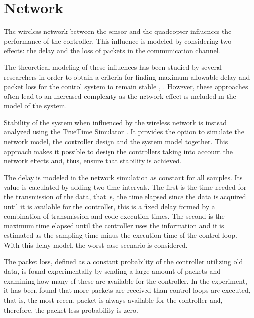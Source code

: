 \section{Network}\label{sec:network}
The wireless network between the sensor and the quadcopter influences the performance of the controller. This influence is modeled by considering two effects: the delay and the loss of packets in the communication channel.


The theoretical modeling of these influences has been studied by several researchers in order to obtain a criteria for finding maximum allowable delay and packet loss for the control system to remain stable  \cite{ling}, \cite{nirupam}. However, these approaches often lead to an increased complexity as the network effect is included in the model of the system.

Stability of the system when influenced by the wireless network is instead analyzed using the TrueTime Simulator \cite{TrueTimeNew}. It  provides the option to simulate the network model, the controller design and the system model together. This approach makes it possible to design the controllers taking into account the network effects and, thus, ensure that stability is achieved.

The delay is modeled in the network simulation as constant for all samples. Its value is calculated by adding two time intervals. The first is the time needed for the transmission of the data, that is, the time elapsed since the data is acquired until it is available for the controller, this is a fixed delay formed by a combination of transmission and code execution times. The second is the maximum time elapsed until the controller uses the information and it is estimated as the sampling time minus the execution time of the control loop. With this delay model, the worst case scenario is considered.

The packet loss, defined as a constant probability of the controller utilizing old data, is found experimentally by sending a large amount of packets and examining how many of these are available for the controller. In the experiment, it has been found that more packets are received than control loops are executed, that is, the most recent packet is always available for the controller and, therefore, the packet loss probability is zero.